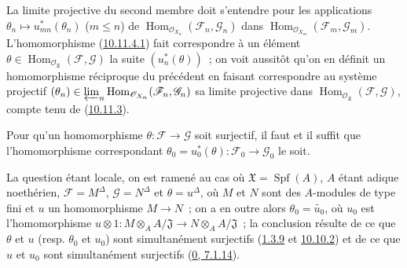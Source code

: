 La limite projective du second membre doit s'entendre pour les
applications
$\theta_n\mapsto u_{mn}^*(\theta_n)$ ($m\leq n$) de
$\operatorname{Hom}_{\mathscr{O}_{X_n}}
(\mathscr{F}_n,\mathscr{G}_n)$ dans
$\operatorname{Hom}_{\mathscr{O}_{X_m}}
(\mathscr{F}_m,\mathscr{G}_m)$. L'homomorphisme
(\hyperref[I.10.11.4.1-fr]{10.11.4.1}) fait correspondre à un élément
$\theta\in\operatorname{Hom}_{\mathscr{O}_{\mathfrak{X}}}
(\mathscr{F},\mathscr{G})$ la suite $(u_n^*(\theta))$~; on voit
aussitôt qu'on en définit un homomorphisme réciproque du précédent en
faisant correspondre au système projectif
$(\theta_n)\in\varprojlim_n
\operatorname{Hom}_{\mathscr{O}_{X_n}}
(\mathscr{F}_n,\mathscr{G}_n)$
sa limite projective dans
$\operatorname{Hom}_{\mathscr{O}_{\mathfrak{X}}}
(\mathscr{F},\mathscr{G})$, compte tenu de
(\hyperref[I.10.11.3-fr]{10.11.3}).

\begin{corollary}[10.11.5]
\label{I.10.11.5-fr}
Pour qu'un homomorphisme $\theta:\mathscr{F}\to\mathscr{G}$ soit
surjectif, il faut et il suffit que l'homomorphisme correspondant
$\theta_0=u_0^*(\theta):\mathscr{F}_0\to\mathscr{G}_0$ le soit.
\end{corollary}

La question étant locale, on est ramené au cas où
$\mathfrak{X}=\operatorname{Spf}(A)$, $A$ étant adique noethérien,
$\mathscr{F}=M^\Delta$, $\mathscr{G}=N^\Delta$ et $\theta=u^\Delta$,
où $M$ et $N$ sont des $A$-modules de type fini et $u$ un
homomorphisme $M\to N$~; on a en outre alors
$\theta_0=\widetilde{u_0}$, où $u_0$ est l'homomorphisme
$u\otimes1:M\otimes_A A/\mathfrak{J}\to
N\otimes_A A/\mathfrak{J}$~;
la conclusion résulte de ce que $\theta$ et $u$ (resp. $\theta_0$ et
$u_0$) sont simultanément surjectifs
(\hyperref[I.1.3.9-fr]{1.3.9} et
\hyperref[I.10.10.2-fr]{10.10.2}) et de ce que $u$ et $u_0$ sont
simultanément surjectifs (\hyperref[0.7.1.14-fr]{0, 7.1.14}).

